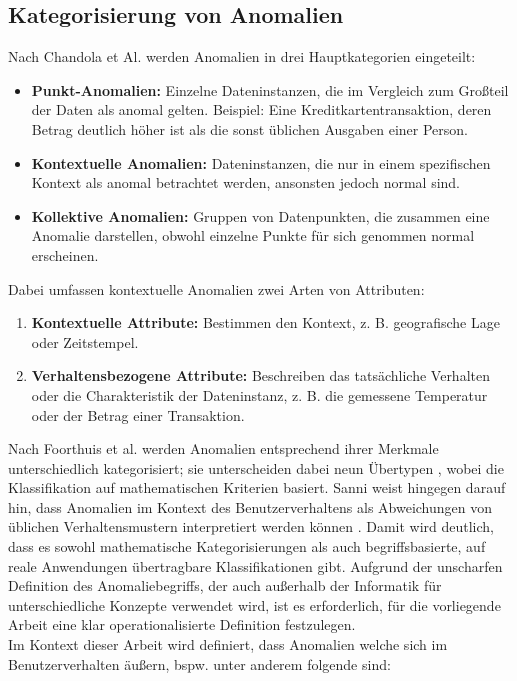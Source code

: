 \documentclass[a4paper,12pt]{article}
\begin{document}
	\subsection{Kategorisierung von Anomalien}
	Nach Chandola et Al. \cite[S.7]{chandola2009anomaly} werden Anomalien in drei Hauptkategorien eingeteilt:
	
	\begin{itemize}
		\item \textbf{Punkt-Anomalien:} Einzelne Dateninstanzen, die im Vergleich zum Großteil der Daten als anomal gelten. Beispiel: Eine Kreditkartentransaktion, deren Betrag deutlich höher ist als die sonst üblichen Ausgaben einer Person.
		\item \textbf{Kontextuelle Anomalien:} Dateninstanzen, die nur in einem spezifischen Kontext als anomal betrachtet werden, ansonsten jedoch normal sind. 
		\item \textbf{Kollektive Anomalien:} Gruppen von Datenpunkten, die zusammen eine Anomalie darstellen, obwohl einzelne Punkte für sich genommen normal erscheinen.
	\end{itemize}
	Dabei umfassen kontextuelle Anomalien zwei Arten von Attributen:
	
	\begin{enumerate}
		\item \textbf{Kontextuelle Attribute:} Bestimmen den Kontext, z. B. geografische Lage oder Zeitstempel.
		\item \textbf{Verhaltensbezogene Attribute:} Beschreiben das tatsächliche Verhalten oder die Charakteristik der Dateninstanz, z. B. die gemessene Temperatur oder der Betrag einer Transaktion.
	\end{enumerate}
	Nach Foorthuis et al. werden Anomalien entsprechend ihrer Merkmale unterschiedlich kategorisiert; sie unterscheiden dabei neun Übertypen \cite{foorthuis2021anomalies}, wobei die Klassifikation auf mathematischen Kriterien basiert. Sanni weist hingegen darauf hin, dass Anomalien im Kontext des Benutzerverhaltens als Abweichungen von üblichen Verhaltensmustern interpretiert werden können \cite[S.3]{Sanni2024}. Damit wird deutlich, dass es sowohl mathematische Kategorisierungen als auch begriffsbasierte, auf reale Anwendungen übertragbare Klassifikationen gibt. Aufgrund der unscharfen Definition des Anomaliebegriffs, der auch außerhalb der Informatik für unterschiedliche Konzepte verwendet wird, ist es erforderlich, für die vorliegende Arbeit eine klar operationalisierte Definition festzulegen.
	\\[0.5em]
	Im Kontext dieser Arbeit wird definiert, dass Anomalien welche sich im Benutzerverhalten äußern, bspw. unter anderem folgende sind:
	
\end{document}
